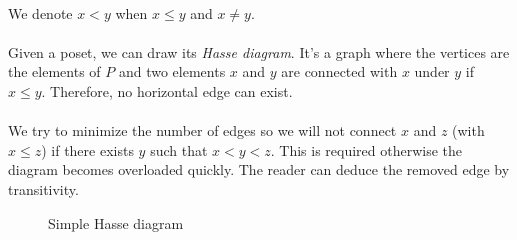 \paragraph{}
We denote $x < y$ when $x \le y$ and $x \neq y$.

\paragraph{}
Given a poset, we can draw its \textit{Hasse diagram}. It's a graph where the vertices are the elements of $P$ and two elements $x$ and $y$ are connected with $x$ under $y$ if $x \le y$. Therefore, no horizontal edge can exist.

\paragraph{}
We try to minimize the number of edges so we will not connect $x$ and $z$ (with $x \le z$) if there exists $y$ such that $x < y < z$. This is required otherwise the diagram becomes overloaded quickly. The reader can deduce the removed edge by transitivity.

\begin{figure}[H]
  \begin{center}
    \caption{Simple Hasse diagram}
  \end{center}
\end{figure}

